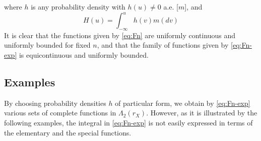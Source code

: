 \documentclass{article}
\begin{document}
where $h$ is any probability density with $h (u) \neq 0$ a.e. [$m$], and
\begin{equation}
  H (u) = \int_{- \infty}^u h (v) m (dv) \label{eq:H}
\end{equation}
It is clear that the functions given by \eqref{eq:Fn} are uniformly continuous
and uniformly bounded for fixed $n$, and that the family of functions given by
\eqref{eq:Fn-exp} is equicontinuous and uniformly bounded.

\subsection*{Examples}

By choosing probability densities $h$ of particular form, we obtain by
\eqref{eq:Fn-exp} various sets of complete functions in $\Lambda_2 (r_X)$.
However, as it is illustrated by the following examples, the integral in
\eqref{eq:Fn-exp} is not easily expressed in terms of the elementary and the
special functions.
\end{document}
